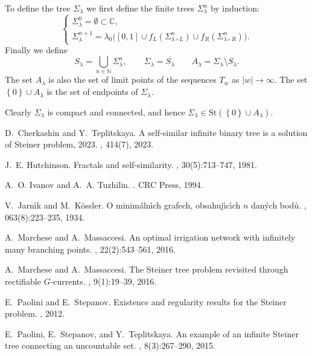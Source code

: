 \documentclass{amsart}
\newcommand{\CC}{\mathbb C}
\newcommand{\NN}{\mathbb N}
\newcommand{\abs}[1]{\left\vert #1 \right\vert}
\newcommand{\ENCLOSE}[1]{\left\{#1\right\}}
\newcommand{\St}{\mathrm{St}}
\theoremstyle{definition}
\theoremstyle{remark}
\begin{document}
To define the tree $\Sigma_\lambda$ we first define the finite trees $\Sigma_\lambda^n$ by induction:
\[
\begin{cases}
  \Sigma_\lambda^0 = \emptyset \subset \CC, \\
  \Sigma_\lambda^{n+1} = \lambda_0\big([0,1] \cup f_L(\Sigma_{\lambda\circ L}^n) \cup f_R(\Sigma_{\lambda\circ R}^n)\big).
\end{cases}
\]
Finally we define
\[
  S_\lambda = \bigcup_{n\in \NN} \Sigma_\lambda^n,
  \qquad
  \Sigma_\lambda = \overline{S_\lambda}
  \qquad
  A_\lambda = \Sigma_\lambda \setminus S_\lambda.
\]
The set $A_\lambda$ is also the set of limit points of the sequences $T_w$ as $\abs{w}\to\infty$. 
The set $\ENCLOSE{0}\cup A_\lambda$ is the set of endpoints of $\Sigma_\lambda$.

Clearly $\Sigma_\lambda$ is compact and connected, and hence $\Sigma_\lambda\in \St(\ENCLOSE{0}\cup A_\lambda)$.



%
\begin{thebibliography}{1}

  D.~Cherkashin and Y.~Teplitskaya.
  \newblock A self-similar infinite binary tree is a solution of Steiner problem,
    2023.
  , 
  414(7), 2023.
  
  J.~E. Hutchinson.
  \newblock Fractals and self-similarity.
  , 30(5):713--747, 1981.
  
  A.~O. Ivanov and A.~A. Tuzhilin.
  .
  \newblock CRC Press, 1994.
  
  V.~Jarn\'\i{}k and M.~K\"o{}ssler.
  \newblock O minim\'a{}ln\'\i{}ch grafech, obsahuj\'\i{}c\'\i{}ch $n$ dan\'y{}ch
    bod\r u{}.
  ,
    063(8):223--235, 1934.
  
  A.~Marchese and A.~Massaccesi.
  \newblock An optimal irrigation network with infinitely many branching points.
  , 22(2):543--561, 2016.
  
  A.~Marchese and A.~Massaccesi.
  \newblock The {S}teiner tree problem revisited through rectifiable
    {$G$}-currents.
  , 9(1):19--39, 2016.
  
  E.~Paolini and E.~Stepanov.
  \newblock Existence and regularity results for the Steiner problem.
  , 2012.
  
  E.~Paolini, E.~Stepanov, and Y.~Teplitskaya.
  \newblock An example of an infinite {S}teiner tree connecting an uncountable
    set.
  , 8(3):267--290, 2015.
\end{thebibliography}
    
\end{document}
